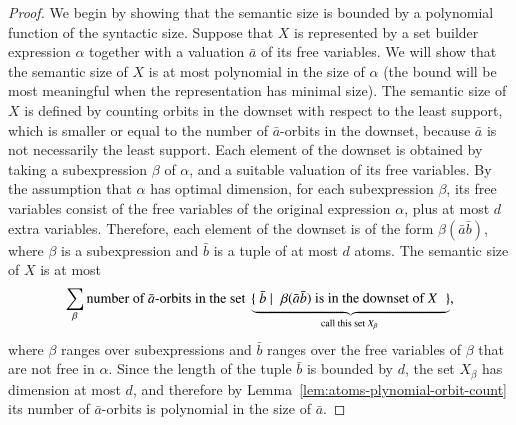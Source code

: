 \begin{proof}
  We begin by showing that the semantic size is bounded by a polynomial function of the syntactic size. Suppose  that $X$ is represented by a set builder expression $\alpha$ together with a valuation $\bar a$ of its free variables. We will  show that the semantic size of $X$ is at most polynomial in the size of $\alpha$ (the bound will be most meaningful when the representation has minimal size). The semantic size of $X$ is defined by counting orbits in the downset with respect to the least support, which is smaller or equal to the number of $\bar a$-orbits in the downset, because $\bar a$ is not necessarily the least support.   Each element of the downset is obtained by taking a subexpression $\beta$ of $\alpha$, and a suitable valuation of its free variables. By the assumption that $\alpha$ has optimal dimension, for each subexpression $\beta$, its free variables consist of the free variables of the original expression $\alpha$, plus at most $d$ extra variables. Therefore, each element of the downset is of the form $\beta(\bar a \bar b)$, where $\beta$ is a subexpression and $\bar b$ is a tuple of at most $d$ atoms. 
  The semantic size of $X$ is at most 
  \begin{align*}
  \sum_{\beta} \text{number of $\bar a$-orbits in the set }\myunderbrace{
  \setbuild{\bar b}{ $\beta(\bar a \bar b)$ is in the downset of $X$}}{call this set $X_\beta$},
  \end{align*}
  where $\beta$ ranges over subexpressions and $\bar b$ ranges over the free variables of $\beta$ that are not free in $\alpha$. Since the length of the tuple $\bar b$ is bounded by $d$, the set $X_\beta$ has dimension at most $d$, and therefore by Lemma~\ref{lem:atoms-plynomial-orbit-count} its number of $\bar a$-orbits is polynomial in the size of $\bar a$. 


\end{proof}
